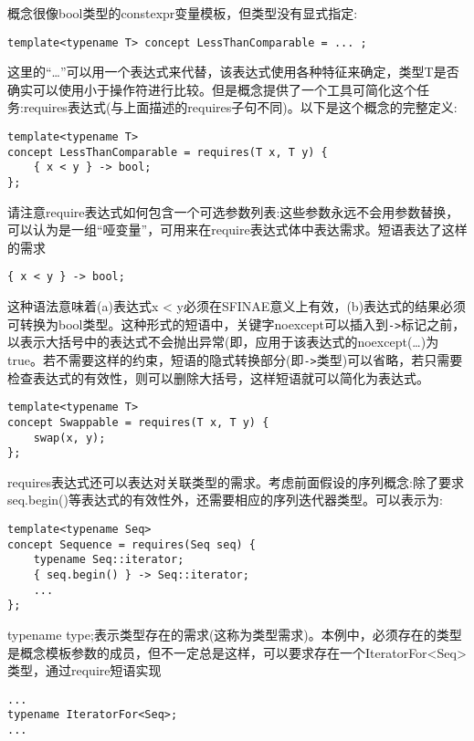 概念很像bool类型的constexpr变量模板，但类型没有显式指定:

\begin{lstlisting}[style=styleCXX]
template<typename T> concept LessThanComparable = ... ;
\end{lstlisting}

这里的“…”可以用一个表达式来代替，该表达式使用各种特征来确定，类型T是否确实可以使用小于操作符进行比较。但是概念提供了一个工具可简化这个任务:requires表达式(与上面描述的requires子句不同)。以下是这个概念的完整定义:

\begin{lstlisting}[style=styleCXX]
template<typename T>
concept LessThanComparable = requires(T x, T y) {
	{ x < y } -> bool;
};
\end{lstlisting}

请注意require表达式如何包含一个可选参数列表:这些参数永远不会用参数替换，可以认为是一组“哑变量”，可用来在require表达式体中表达需求。短语表达了这样的需求

\begin{lstlisting}[style=styleCXX]
{ x < y } -> bool;
\end{lstlisting}

这种语法意味着(a)表达式x < y必须在SFINAE意义上有效，(b)表达式的结果必须可转换为bool类型。这种形式的短语中，关键字noexcept可以插入到\texttt{->}标记之前，以表示大括号中的表达式不会抛出异常(即，应用于该表达式的noexcept(…)为true。若不需要这样的约束，短语的隐式转换部分(即\texttt{->}类型)可以省略，若只需要检查表达式的有效性，则可以删除大括号，这样短语就可以简化为表达式。

\begin{lstlisting}[style=styleCXX]
template<typename T>
concept Swappable = requires(T x, T y) {
	swap(x, y);
};
\end{lstlisting}

requires表达式还可以表达对关联类型的需求。考虑前面假设的序列概念:除了要求seq.begin()等表达式的有效性外，还需要相应的序列迭代器类型。可以表示为:

\begin{lstlisting}[style=styleCXX]
template<typename Seq>
concept Sequence = requires(Seq seq) {
	typename Seq::iterator;
	{ seq.begin() } -> Seq::iterator;
	...
};
\end{lstlisting}

typename type;表示类型存在的需求(这称为类型需求)。本例中，必须存在的类型是概念模板参数的成员，但不一定总是这样，可以要求存在一个IteratorFor<Seq>类型，通过require短语实现

\begin{lstlisting}[style=styleCXX]
...
typename IteratorFor<Seq>;
...
\end{lstlisting}

